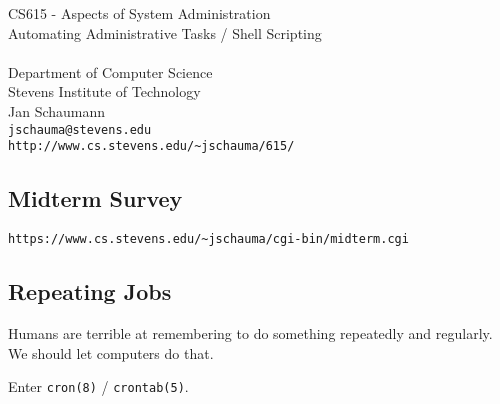 \documentclass[xga]{xdvislides}
\begin{document}
\setfontphv

\lhead{\slidetitle}                               %
\cfoot{\relax}                               %
\rfoot{\Gray{\today}}

\vspace*{\fill}
\begin{center}
	\Hugesize
		CS615 - Aspects of System Administration\\ [1em]
		Automating Administrative Tasks / Shell Scripting\\ [1em]

	\hspace*{5mm}\blueline\\ [1em]
	\Normalsize
		Department of Computer Science\\
		Stevens Institute of Technology\\
		Jan Schaumann\\
		\verb+jschauma@stevens.edu+\\
		\verb+http://www.cs.stevens.edu/~jschauma/615/+
\end{center}
\vspace*{\fill}

\subsection{Midterm Survey}
\vspace*{\fill}
\begin{center}
\begin{verbatim}
https://www.cs.stevens.edu/~jschauma/cgi-bin/midterm.cgi
\end{verbatim}
\end{center}
\vspace*{\fill}

\subsection{Repeating Jobs}
Humans are terrible at remembering to do something repeatedly and
regularly.  We should let computers do that. \\

\vspace{.5in}

Enter \verb+cron(8)+ / \verb+crontab(5)+.
\end{document}
